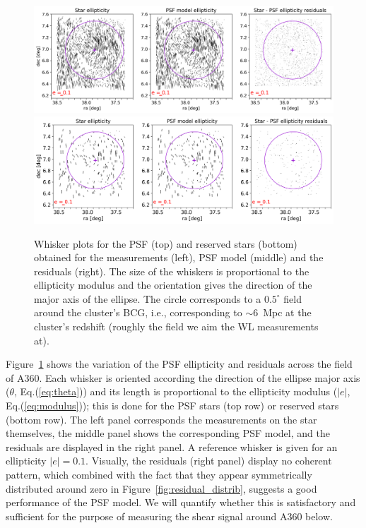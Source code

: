 \documentclass[SE,lsstdraft,authoryear,toc]{lsstdoc}
\begin{document}
\begin{figure}
\includegraphics[width=\textwidth]{Figures/whiskers_used_big.png}
\includegraphics[width=\textwidth]{Figures/whiskers_reserved_big.png}
\caption{Whisker plots for the PSF (top) and reserved stars (bottom) obtained for the measurements (left), PSF model (middle) and the residuals (right). The size of the whiskers is proportional to the ellipticity modulus and the orientation gives the direction of the major axis of the ellipse. The circle corresponds to a $0.5^\circ$  field around the cluster’s BCG, i.e., corresponding to $\sim 6$~Mpc at the cluster's redshift (roughly the field we aim the WL measurements at).\label{fig:whiskers}}
\end{figure}

Figure~\ref{fig:whiskers} shows the variation of the PSF ellipticity and residuals across the field of A360. Each whisker is oriented according the direction of the ellipse major axis ($\theta$, Eq.(\ref{eq:theta})) and its length is proportional to the ellipticity modulus ($|e|$, Eq.(\ref{eq:modulus})); this is done for the PSF stars (top row) or reserved stars (bottom row). The left panel corresponds the measurements on the star themselves, the middle panel shows the corresponding PSF model, and the residuals are displayed in the right panel. A reference whisker is given for an ellipticity $|e| = 0.1$. Visually, the residuals (right panel) display no coherent pattern, which combined with the fact that they appear symmetrically distributed around zero in Figure~\ref{fig:residual_distrib}, suggests a good performance of the PSF model. We will quantify whether this is satisfactory and sufficient for the purpose of measuring the shear signal around A360 below.
\end{document}
